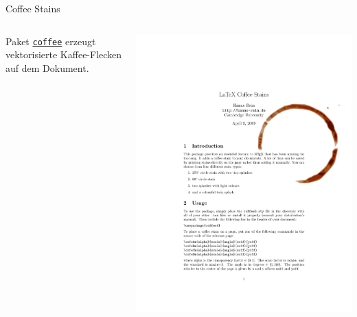 \documentclass[
	vorläufig=false,
	datum=2021-12-22,
	titel={Witziges, Obskures und Sinnvolles…},
	web=false,
 	aspectratio=1610,
 	max,
]{../tex/latexkurs-slides}
\begin{document}
\begin{frame}{Coffee Stains}
	\begin{columns}
		\begin{column}{.5\textwidth}
			Paket \alert{\href{http://hanno-rein.de/archives/349}{\texttt{coffee}}} erzeugt vektorisierte Kaffee-Flecken auf dem Dokument.
		\end{column}
		\begin{column}{.5\textwidth}\vspace{-3.5em}
			\includegraphics[page=1,width=\textwidth]{coffee4.pdf}
		\end{column}
	\end{columns}
\end{frame}
\end{document}

